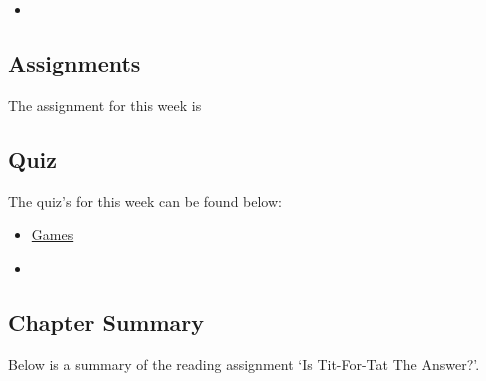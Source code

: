 \begin{itemize}
    \item {}
\end{itemize}

\subsection{Assignments}

The assignment for this week is   

\subsection{Quiz}

The quiz's for this week can be found below:

\begin{itemize}
    \item \href{https://applied.cs.colorado.edu/mod/quiz/view.php?id=49415}{Games}  
    \item {}
\end{itemize}

\subsection{Chapter Summary}

Below is a summary of the reading assignment `Is Tit-For-Tat The Answer?'.

